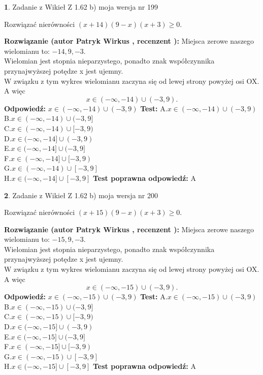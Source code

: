 \documentclass[12pt, a4paper]{article}
\theoremstyle{definition} %
\newtheorem{zad}{}
\newcommand{\zadStart}[1]{\begin{zad}#1\newline}
\newcommand{\zadStop}{\end{zad}}
\newcommand{\rozwStart}[2]{\noindent \textbf{Rozwiązanie (autor #1 , recenzent #2): }\newline}
\newcommand{\rozwStop}{\newline}
\newcommand{\odpStart}{\noindent \textbf{Odpowiedź:}\newline}
\newcommand{\odpStop}{\newline}
\newcommand{\testStart}{\noindent \textbf{Test:}\newline}
\newcommand{\testStop}{\newline}
\newcommand{\kluczStart}{\noindent \textbf{Test poprawna odpowiedź:}\newline}
\newcommand{\kluczStop}{\newline}
\begin{document}
\zadStart{Zadanie z Wikieł Z 1.62 b) moja wersja nr 199}

Rozwiązać nierówności $(x+14)(9-x)(x+3)\ge0$.
\zadStop
\rozwStart{Patryk Wirkus}{}
Miejsca zerowe naszego wielomianu to: $-14, 9, -3$.\\
Wielomian jest stopnia nieparzystego, ponadto znak współczynnika przy\linebreak najwyższej potędze x jest ujemny.\\ W związku z tym wykres wielomianu zaczyna się od lewej strony powyżej osi OX. A więc $$x \in (-\infty,-14) \cup (-3,9).$$
\rozwStop
\odpStart
$x \in (-\infty,-14) \cup (-3,9)$
\odpStop
\testStart
A.$x \in (-\infty,-14) \cup (-3,9)$\\
B.$x \in (-\infty,-14) \cup (-3,9]$\\
C.$x \in (-\infty,-14) \cup [-3,9)$\\
D.$x \in (-\infty,-14] \cup (-3,9)$\\
E.$x \in (-\infty,-14] \cup (-3,9]$\\
F.$x \in (-\infty,-14] \cup [-3,9)$\\
G.$x \in (-\infty,-14) \cup [-3,9]$\\
H.$x \in (-\infty,-14] \cup [-3,9]$
\testStop
\kluczStart
A
\kluczStop



\zadStart{Zadanie z Wikieł Z 1.62 b) moja wersja nr 200}

Rozwiązać nierówności $(x+15)(9-x)(x+3)\ge0$.
\zadStop
\rozwStart{Patryk Wirkus}{}
Miejsca zerowe naszego wielomianu to: $-15, 9, -3$.\\
Wielomian jest stopnia nieparzystego, ponadto znak współczynnika przy\linebreak najwyższej potędze x jest ujemny.\\ W związku z tym wykres wielomianu zaczyna się od lewej strony powyżej osi OX. A więc $$x \in (-\infty,-15) \cup (-3,9).$$
\rozwStop
\odpStart
$x \in (-\infty,-15) \cup (-3,9)$
\odpStop
\testStart
A.$x \in (-\infty,-15) \cup (-3,9)$\\
B.$x \in (-\infty,-15) \cup (-3,9]$\\
C.$x \in (-\infty,-15) \cup [-3,9)$\\
D.$x \in (-\infty,-15] \cup (-3,9)$\\
E.$x \in (-\infty,-15] \cup (-3,9]$\\
F.$x \in (-\infty,-15] \cup [-3,9)$\\
G.$x \in (-\infty,-15) \cup [-3,9]$\\
H.$x \in (-\infty,-15] \cup [-3,9]$
\testStop
\kluczStart
A
\kluczStop
\end{document}
